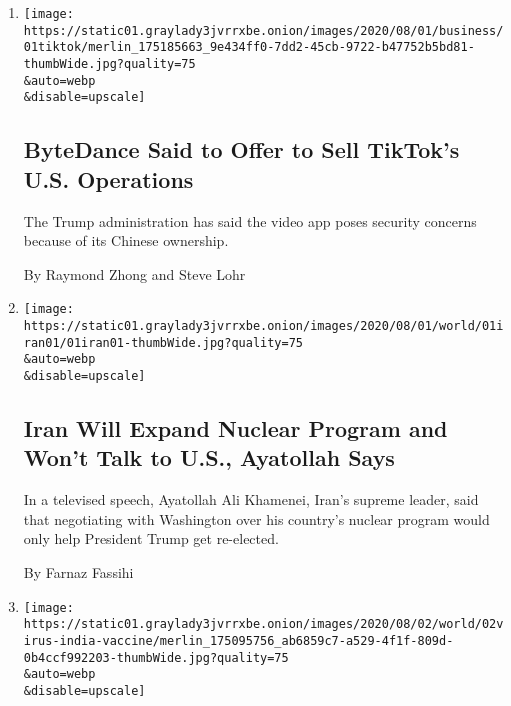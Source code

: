 \begin{enumerate}
\def\labelenumi{\arabic{enumi}.}
\item
  \href{/2020/08/01/technology/tiktok-sale-trump-ban.html}{}

  \texttt{[image: https://static01.graylady3jvrrxbe.onion/images/2020/08/01/business/01tiktok/merlin\_175185663\_9e434ff0-7dd2-45cb-9722-b47752b5bd81-thumbWide.jpg?quality=75\\\&auto=webp\\\&disable=upscale]}

  \hypertarget{bytedance-said-to-offer-to-sell-tiktoks-us-operations}{%
  \subsection{ByteDance Said to Offer to Sell TikTok's U.S.
  Operations}\label{bytedance-said-to-offer-to-sell-tiktoks-us-operations}}

  The Trump administration has said the video app poses security
  concerns because of its Chinese ownership.

  By Raymond Zhong and Steve Lohr
\item
  \href{/2020/08/01/world/asia/iran-khamenei-us-sanctions.html}{}

  \texttt{[image: https://static01.graylady3jvrrxbe.onion/images/2020/08/01/world/01iran01/01iran01-thumbWide.jpg?quality=75\\\&auto=webp\\\&disable=upscale]}

  \hypertarget{iran-will-expand-nuclear-program-and-wont-talk-to-us-ayatollah-says}{%
  \subsection{Iran Will Expand Nuclear Program and Won't Talk to U.S.,
  Ayatollah
  Says}\label{iran-will-expand-nuclear-program-and-wont-talk-to-us-ayatollah-says}}

  In a televised speech, Ayatollah Ali Khamenei, Iran's supreme leader,
  said that negotiating with Washington over his country's nuclear
  program would only help President Trump get re-elected.

  By Farnaz Fassihi
\item
  \href{/2020/08/01/world/asia/coronavirus-vaccine-india.html}{}

  \texttt{[image: https://static01.graylady3jvrrxbe.onion/images/2020/08/02/world/02virus-india-vaccine/merlin\_175095756\_ab6859c7-a529-4f1f-809d-0b4ccf992203-thumbWide.jpg?quality=75\\\&auto=webp\\\&disable=upscale]}

  \hypertarget{indian-billionaires-bet-big-on-head-start-in-coronavirus-vaccine-race}{%
}
\end{enumerate}
